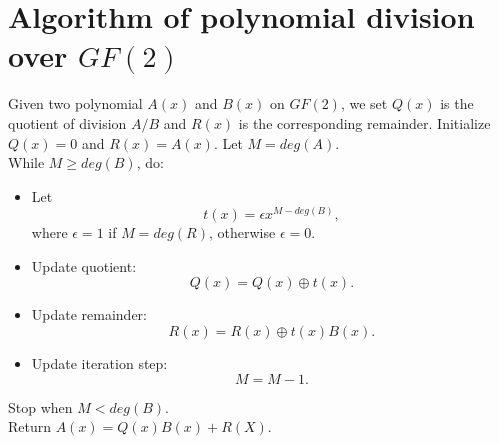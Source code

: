 \documentclass[12pt]{article}
\begin{document}
\section{Algorithm of polynomial division over $GF(2)$}
    Given two polynomial $A(x)$ and $B(x)$ on $GF(2)$, we set $Q(x)$ is the quotient of division $A/B$ and $R(x)$ is the corresponding remainder. Initialize $Q(x) = 0$ and $R(x) = A(x)$. Let $M = deg(A)$. \\
    While $M \geq deg(B)$, do: 
    \begin{itemize}
        \item[1] Let $$t(x) = \epsilon x^{M-deg(B)},$$ 
        where $\epsilon = 1$ if $M = deg(R)$, otherwise $\epsilon = 0$.
        \item[2] Update quotient: 
        $$ Q(x) = Q(x) \oplus t(x).$$
        \item[3] Update remainder:
        $$R(x) = R(x) \oplus t(x)B(x).$$
        \item[4] Update iteration step: 
        $$M = M - 1.$$
    \end{itemize}
    Stop when $M < deg(B).$ \\
    Return $A(x) = Q(x)B(x) + R(X).$
\end{document}
